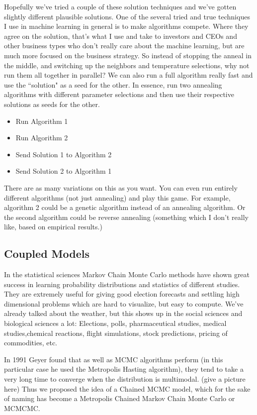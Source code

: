 \documentclass{article}
\theoremstyle{definition}
\theoremstyle{remark}
\begin{document}
Hopefully we've tried a couple of these solution techniques and we've gotten slightly different plausible solutions. One of the several  tried and true techniques I use in machine learning in general is to make algorithms compete.  Where they agree on the solution, that's what I use and take to investors and CEOs and other business types who don't really care about the machine learning, but are much more focused on the business strategy.
So instead of stopping the anneal in the middle, and switching up the neighbors and temperature selections, why not run them all together in parallel?  We can also run a full algorithm really fast and use the ``solution" as a seed for the other.  In essence, run two annealing algorithms with different parameter selections and then use their respective solutions as seeds for the other.
\begin{itemize}
	\item Run Algorithm 1
	\item Run Algorithm 2
	\item Send Solution 1 to Algorithm 2
	\item Send Solution 2 to Algorithm 1
\end{itemize}

There are as many variations on this as you want.
You can even run entirely different algorithms (not just annealing) and play this game.  For example, algorithm 2 could be a genetic algorithm instead of an annealing algorithm. Or the second algorithm could be reverse annealing (something which I don't really like, based on empirical results.)

\subsection{Coupled Models}

In the statistical sciences Markov Chain Monte Carlo methods have shown great success in learning probability distributions and statistics of different studies.  They are extremely useful for giving good election forecasts and settling high dimensional problems which are hard to visualize, but easy to compute.  We've already talked about the weather, but this shows up in the social sciences and biological sciences a lot: Elections, polls, pharmaceutical studies, medical studies,chemical reactions, flight simulations, stock predictions, pricing of commodities, etc.

In 1991 Geyer found that as well as MCMC algorithms perform (in this particular case he used the Metropolis Hasting algorithm), they tend to take a very long time to converge when the distribution is multimodal.  (give a picture here)  Thus we proposed the idea of a Chained MCMC model, which for the sake of naming has become a Metropolis Chained Markov Chain Monte Carlo or MCMCMC.
\end{document}
